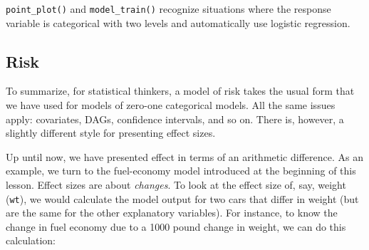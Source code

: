 \documentclass[
  letterpaper,
  DIV=11,
  numbers=noendperiod,
  oneside]{scrartcl}
\begin{document}
{
\makeatletter
\def\LT@makecaption#1#2#3{%
  \noalign{\smash{\hbox{\kern\textwidth\rlap{\kern\marginparsep
  \parbox[t]{\marginparwidth}{%
    \footnotesize{%
      \vspace{(1.1\baselineskip)}
    #1{#2: }\ignorespaces #3}}}}}}%
    }
\makeatother

\begin{figure}



\end{figure}%

}

\texttt{point\_plot()} and \texttt{model\_train()} recognize situations
where the response variable is categorical with two levels and
automatically use logistic regression.

\subsection{Risk}\label{risk}

To summarize, for statistical thinkers, a model of risk takes the usual
form that we have used for models of zero-one categorical models. All
the same issues apply: covariates, DAGs, confidence intervals, and so
on. There is, however, a slightly different style for presenting effect
sizes.

Up until now, we have presented effect in terms of an arithmetic
difference. As an example, we turn to the fuel-economy model introduced
at the beginning of this lesson. Effect sizes are about \emph{changes}.
To look at the effect size of, say, weight (\texttt{wt}), we would
calculate the model output for two cars that differ in weight (but are
the same for the other explanatory variables). For instance, to know the
change in fuel economy due to a 1000 pound change in weight, we can do
this calculation:
\end{document}

